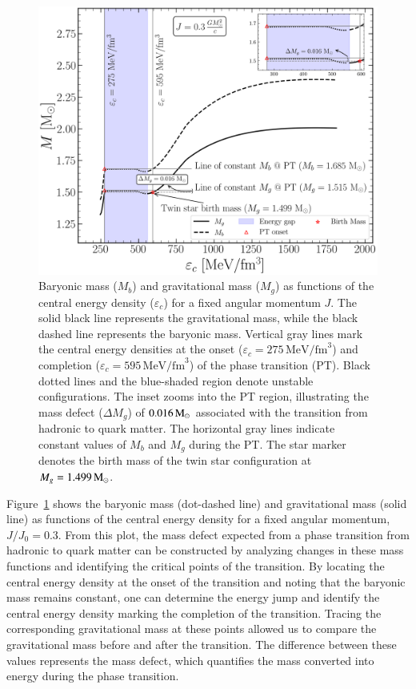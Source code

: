 \documentclass[main.tex]{subfiles}
\begin{document}
    \begin{figure}[t!]
        \centering
        \includegraphics[width=0.5\columnwidth]{figures/chapter4/mass_vs_energy.png}
        \caption{Baryonic mass ($M_b$) and gravitational mass ($M_g$) as functions of the central energy density ($\varepsilon_c$) for a fixed angular momentum $J$. The solid black line represents the gravitational mass, while the black dashed line represents the baryonic mass. Vertical gray lines mark the central energy densities at the onset ($\varepsilon_c = 275\,\text{MeV/fm}^3$) and completion ($\varepsilon_c = 595\,\text{MeV/fm}^3$) of the phase transition (PT). Black dotted lines and the blue-shaded region denote unstable configurations.
        The inset zooms into the PT region, illustrating the mass defect ($\Delta M_g$) of $0.016\mathrm{\,M_\odot}$ associated with the transition from hadronic to quark matter. The horizontal gray lines indicate constant values of $M_b$ and $M_g$ during the PT. The star marker denotes the birth mass of the twin star configuration at $M_g = 1.499\mathrm{\,M_\odot}$.}
        \label{fig:mvse}
    \end{figure}
    
    Figure~\ref{fig:mvse} shows the baryonic mass (dot-dashed line) and gravitational mass (solid line) as functions of the central energy density for a fixed angular momentum, $J/J_0 = 0.3$. From this plot, the mass defect expected from a phase transition from hadronic to quark matter can be constructed by analyzing changes in these mass functions and identifying the critical points of the transition. By locating the central energy density at the onset of the transition and noting that the baryonic mass remains constant, one can determine the energy jump and identify the central energy density marking the completion of the transition. Tracing the corresponding gravitational mass at these points allowed us to compare the gravitational mass before and after the transition. The difference between these values represents the mass defect, which quantifies the mass converted into energy during the phase transition.
    
\end{document}
